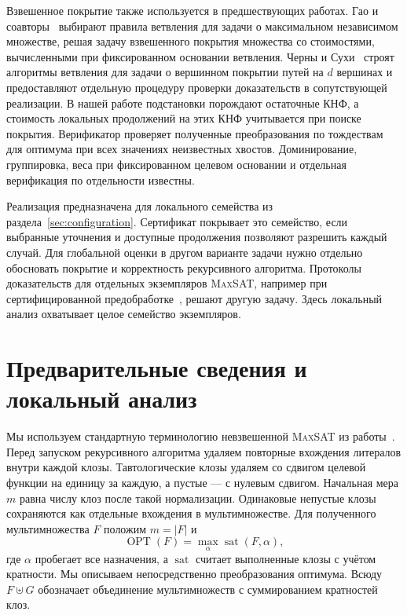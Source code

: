 \documentclass[10pt,twoside]{article}
\newcommand{\MaxSAT}{\textnormal{\textsc{MaxSAT}}}
\newcommand{\OPT}{\operatorname{OPT}}
\theoremstyle{definition}
\theoremstyle{remark}
\begin{document}
Взвешенное покрытие также используется в предшествующих работах. Гао и
соавторы~\cite{GaoEtAl2024} выбирают правила ветвления для задачи о
максимальном независимом множестве, решая задачу взвешенного покрытия
множества со стоимостями, вычисленными при фиксированном основании
ветвления. Черны и Сухи~\cite{CervenySuchy2023} строят алгоритмы ветвления
для задачи о вершинном покрытии путей на $d$ вершинах и предоставляют
отдельную процедуру проверки доказательств в сопутствующей реализации.
В нашей работе подстановки порождают остаточные КНФ, а стоимость
локальных продолжений на этих КНФ учитывается при поиске покрытия.
Верификатор проверяет полученные преобразования по тождествам для
оптимума при всех значениях неизвестных хвостов. Доминирование,
группировка, веса при фиксированном целевом основании и отдельная
верификация по отдельности известны.

Реализация предназначена для локального семейства из раздела~\ref{sec:configuration}.
Сертификат покрывает это семейство, если выбранные уточнения и доступные
продолжения позволяют разрешить каждый случай. Для глобальной оценки в
другом варианте задачи нужно отдельно обосновать покрытие и корректность
рекурсивного алгоритма. Протоколы доказательств для отдельных экземпляров
\MaxSAT{}, например при сертифицированной предобработке~\cite{IhalainenEtAl2024},
решают другую задачу. Здесь локальный анализ охватывает целое семейство
экземпляров.

\section{Предварительные сведения и локальный анализ}
\label{sec:preliminaries}

Мы используем стандартную терминологию невзвешенной \MaxSAT{} из
работы~\cite{Xiao2022}. Перед запуском рекурсивного алгоритма удаляем
повторные вхождения литералов внутри каждой клозы. Тавтологические клозы
удаляем со сдвигом целевой функции на единицу за каждую, а пустые ---
с нулевым сдвигом. Начальная мера $m$ равна числу клоз после такой
нормализации. Одинаковые непустые клозы сохраняются как отдельные
вхождения в мультимножестве.
Для полученного мультимножества $F$ положим $m=|F|$ и
\[
  \OPT(F)=\max_{\alpha}\operatorname{sat}(F,\alpha),
\]
где $\alpha$ пробегает все назначения, а $\operatorname{sat}$ считает
выполненные клозы с учётом кратности. Мы описываем непосредственно
преобразования оптимума.
Всюду $F\uplus G$ обозначает объединение мультимножеств с суммированием
кратностей клоз.
\end{document}
